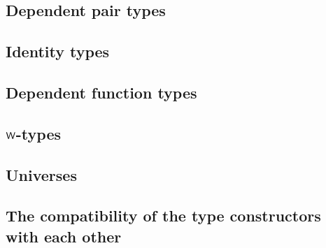 \subsection{Dependent pair types}

\subsection{Identity types}

\subsection{Dependent function types}

\subsection{${\mathsf{W}}$-types}

\subsection{Universes}

\subsection{The compatibility of the type constructors with each other}
\label{compatibility-of-type-constructors}

